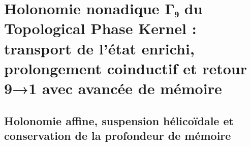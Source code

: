 \chapter{Holonomie nonadique Γ₉ du Topological Phase Kernel : transport de l'état enrichi, prolongement coinductif et retour 9→1 avec avancée de mémoire}
\label{chap:sucesor-102-08}
\label{owner:sucesor-102-20-arquitectura-desarrollo-holonomico}
\label{owner:sucesor-102-u008-u010-unicos}

\begin{HMTScientificOwnerSubordinated}
\let\HMTLabelBeforeOwnerSixD\label
\renewcommand{\label}[1]{%
  \ifstrequal{#1}{thm:eje-espejo-nonadico}%
    {\HMTLabelBeforeOwnerSixD{owner06d:thm:eje-espejo-nonadico}}%
    {\HMTLabelBeforeOwnerSixD{#1}}%
}

\end{HMTScientificOwnerSubordinated}


\section{Holonomie affine, suspension hélicoïdale et conservation de la profondeur de mémoire}
\begin{HMTSpiralIntegratedBody}

\end{HMTSpiralIntegratedBody}












